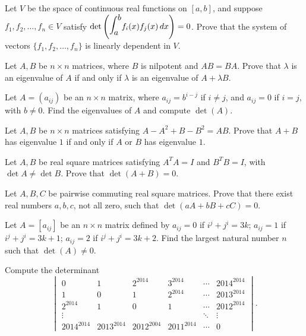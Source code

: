 \documentclass[12pt]{article}
\let\oldint\int
\renewcommand{\int}{\mathlarger{\mathlarger{\oldint}}}
\begin{document}
\begin{problem}
Let $V$ be the space of continuous real functions on $[a,b]$, and suppose $f_1,f_2,\dots,f_n\in V$ satisfy $\det\left(\int_a^b f_i(x)f_j(x)\,dx\right)=0$. Prove that the system of vectors $\{f_1,f_2,\dots,f_n\}$ is linearly dependent in $V$.
\end{problem}

\begin{problem}
Let $A,B$ be $n\times n$ matrices, where $B$ is nilpotent and $AB=BA$. Prove that $\lambda$ is an eigenvalue of $A$ if and only if $\lambda$ is an eigenvalue of $A+\lambda B$.
\end{problem}

\begin{problem}
Let $A=(a_{ij})$ be an $n\times n$ matrix, where $a_{ij}=b^{i-j}$ if $i\neq j$, and $a_{ij}=0$ if $i=j$, with $b\neq 0$. Find the eigenvalues of $A$ and compute $\det(A)$.
\end{problem}

\begin{problem}
Let $A,B$ be $n\times n$ matrices satisfying $A-A^2+B-B^2=AB$. Prove that $A+B$ has eigenvalue $1$ if and only if $A$ or $B$ has eigenvalue $1$.
\end{problem}

\begin{problem}
Let $A,B$ be real square matrices satisfying $A^TA=I$ and $B^TB=I$, with $\det A \neq \det B$. Prove that $\det(A+B)=0$.
\end{problem}

\begin{problem}
Let $A,B,C$ be pairwise commuting real square matrices. Prove that there exist real numbers $a,b,c$, not all zero, such that $\det(aA+bB+cC)=0$.
\end{problem}

\begin{problem}
Let $A=[a_{ij}]$ be an $n\times n$ matrix defined by $a_{ij}=0$ if $i^j+j^i=3k$; $a_{ij}=1$ if $i^j+j^i=3k+1$; $a_{ij}=2$ if $i^j+j^i=3k+2$. Find the largest natural number $n$ such that $\det(A)\neq 0$.
\end{problem}

\begin{problem}
Compute the determinant
\[
\begin{vmatrix}
0 & 1 & 2^{2014} & 3^{2014} & \cdots & 2014^{2014}\\
1 & 0 & 1 & 2^{2014} & \cdots & 2013^{2014}\\
2^{2014} & 1 & 0 & 1 & \cdots & 2012^{2014}\\
\vdots & & & & \ddots & \vdots\\
2014^{2014} & 2013^{2014} & 2012^{2004} & 2011^{2014} & \cdots & 0
\end{vmatrix}.
\]
\end{problem}
\end{document}

